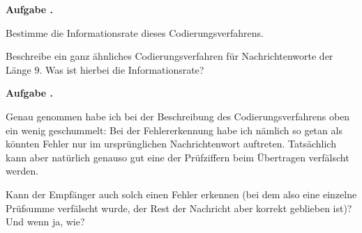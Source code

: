 \documentclass[a4paper,ngerman,12pt]{scrartcl}
\theoremstyle{definition}
\theoremstyle{plain}
\theoremstyle{remark}
\newlength{\aufgabenskip}
\newcounter{aufgabennummer}
\newenvironment{aufgabe}[1]{
	\addtocounter{aufgabennummer}{1}
	\textbf{Aufgabe \theaufgabennummer.} \emph{#1} \par
}{\vspace{\aufgabenskip}}
\begin{document}
\begin{aufgabe}{}
	Bestimme die Informationsrate dieses Codierungsverfahrens.
	
	Beschreibe ein ganz ähnliches Codierungsverfahren für Nachrichtenworte der Länge $9$. Was ist hierbei die Informationsrate?
\end{aufgabe}

\begin{aufgabe}{}
	Genau genommen habe ich bei der Beschreibung des Codierungsverfahrens oben ein wenig geschummelt: Bei der Fehlererkennung habe ich nämlich so getan als könnten Fehler nur im ursprünglichen Nachrichtenwort auftreten. Tatsächlich kann aber natürlich genauso gut eine der Prüfziffern beim Übertragen verfälscht werden. 
	
	Kann der Empfänger auch solch einen Fehler erkennen (bei dem also eine einzelne Prüfsumme verfälscht wurde, der Rest der Nachricht aber korrekt geblieben ist)? Und wenn ja, wie?
\end{aufgabe}
\end{document}
